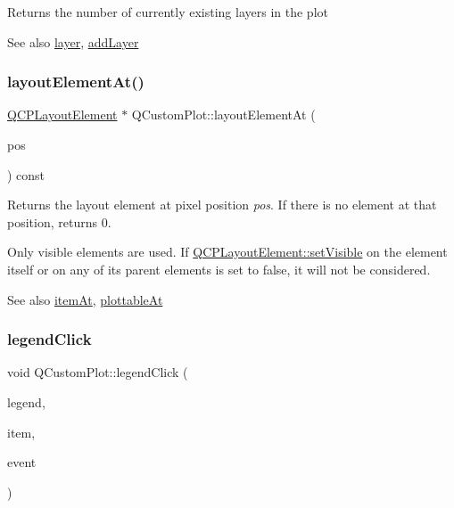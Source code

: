 Returns the number of currently existing layers in the plot

\begin{DoxySeeAlso}{See also}
\hyperlink{class_q_custom_plot_a0a96244e7773b242ef23c32b7bdfb159}{layer}, \hyperlink{class_q_custom_plot_ad5255393df078448bb6ac83fa5db5f52}{add\+Layer} 
\end{DoxySeeAlso}
\mbox{\label{class_q_custom_plot_afaa1d304e0287d140fd238e90889ef3c}} 
\subsubsection{\texorpdfstring{layout\+Element\+At()}{layoutElementAt()}}
{\footnotesize\ttfamily \hyperlink{class_q_c_p_layout_element}{Q\+C\+P\+Layout\+Element} $\ast$ Q\+Custom\+Plot\+::layout\+Element\+At (\begin{DoxyParamCaption}\item[{const Q\+PointF \&}]{pos }\end{DoxyParamCaption}) const}

Returns the layout element at pixel position {\itshape pos}. If there is no element at that position, returns 0.

Only visible elements are used. If \hyperlink{class_q_c_p_layerable_a3bed99ddc396b48ce3ebfdc0418744f8}{Q\+C\+P\+Layout\+Element\+::set\+Visible} on the element itself or on any of its parent elements is set to false, it will not be considered.

\begin{DoxySeeAlso}{See also}
\hyperlink{class_q_custom_plot_ac08578e0e6c059c83a8d340ba0038e8e}{item\+At}, \hyperlink{class_q_custom_plot_acddbbd8b16dd633f0d94e5a736fbd8cf}{plottable\+At} 
\end{DoxySeeAlso}
\mbox{\label{class_q_custom_plot_a79cff0baafbca10a3aaf694d2d3b9ab3}} 
\subsubsection{\texorpdfstring{legend\+Click}{legendClick}}
{\footnotesize\ttfamily void Q\+Custom\+Plot\+::legend\+Click (\begin{DoxyParamCaption}\item[{\hyperlink{class_q_c_p_legend}{Q\+C\+P\+Legend} $\ast$}]{legend,  }\item[{\hyperlink{class_q_c_p_abstract_legend_item}{Q\+C\+P\+Abstract\+Legend\+Item} $\ast$}]{item,  }\item[{Q\+Mouse\+Event $\ast$}]{event }\end{DoxyParamCaption})\hspace{0.3cm}{\ttfamily [signal]}}

